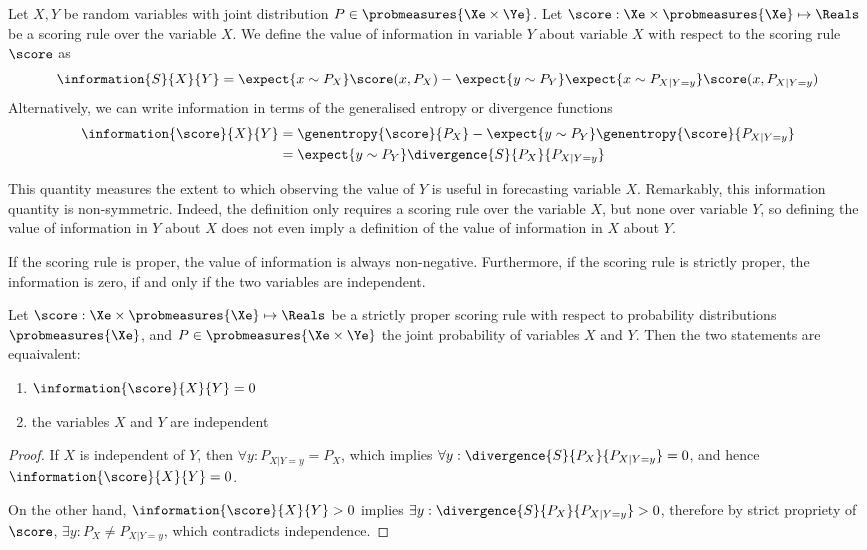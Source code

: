 \begin{definition}
	Let $X,Y$ be random variables with joint distribution $P\in\probmeasures{\Xe\times\Ye}$. Let $\score:\Xe\times\probmeasures{\Xe}\mapsto\Reals$ be a scoring rule over the variable $X$. We define the value of information in variable $Y$ about variable $X$ with respect to the scoring rule $\score$ as
	\begin{equation}
		\information{S}{X}{Y} =  \expect{x\sim P_{X}}\score(x,P_{X})- \expect{y\sim P_{Y}} \expect{x\sim P_{X\vert Y=y}}\score(x,P_{X\vert Y=y})
	\end{equation}
	Alternatively, we can write information in terms of the generalised entropy or divergence functions
		\begin{align}
			\information{\score}{X}{Y} &=  \genentropy{\score}{P_{X}} - \expect{y \sim P_{Y}} \genentropy{\score}{P_{X\vert Y=y}}\\
				&= \expect{y\sim P_{Y}}\divergence{S}{P_{X}}{P_{X\vert Y=y}}
		\end{align}
\end{definition}

This quantity measures the extent to which observing the value of $Y$ is useful in forecasting variable $X$. Remarkably, this information quantity is non-symmetric. Indeed, the definition only requires a scoring rule over the variable $X$, but none over variable $Y$, so defining the value of information in $Y$ about $X$ does not even imply a definition of the value of information in $X$ about $Y$.

If the scoring rule is proper, the value of information is always non-negative. Furthermore, if the scoring rule is strictly proper, the information is zero, if and only if the two variables are independent.

\begin{theorem}
	Let $\score:\Xe\times\probmeasures{\Xe}\mapsto\Reals$ be a strictly proper scoring rule with respect to probability distributions $\probmeasures{\Xe}$, and $P\in\probmeasures{\Xe\times\Ye}$ the joint probability of variables $X$ and $Y$. Then the two statements are equaivalent:
	\begin{enumerate}
		\item $\information{\score}{X}{Y} = 0$
		\item the variables $X$ and $Y$ are independent
	\end{enumerate}
	\begin{proof}
		If $X$ is independent of $Y$, then $\forall y: P_{X\vert Y=y} = P_{X}$, which implies $\forall y:  \divergence{S}{P_{X}}{P_{X\vert Y=y}}=0$, and hence $\information{\score}{X}{Y} = 0$.
		
		On the other hand, $\information{\score}{X}{Y} > 0$ implies $\exists y: \divergence{S}{P_{X}}{P_{X\vert Y=y}} > 0$, therefore by strict propriety of $\score$, $\exists y: P_X \neq P_{X\vert Y=y}$, which contradicts independence.
	\end{proof}
\end{theorem}

